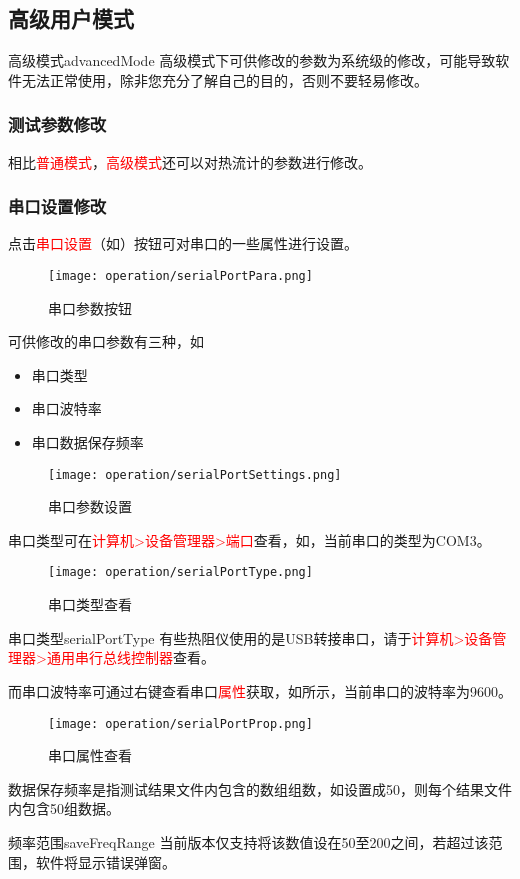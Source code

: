 \subsection{高级用户模式\label{subsec:advancedUser}}
\begin{tips}{高级模式}{advancedMode}
    高级模式下可供修改的参数为系统级的修改，可能导致软件无法正常使用，除非您充分了解自己的目的，否则不要轻易修改。
\end{tips}
\subsubsection*{测试参数修改}
相比\textcolor{red}{普通模式}，\textcolor{red}{高级模式}还可以对热流计的参数进行修改。
\subsubsection*{串口设置修改}
点击\textcolor{red}{串口设置}（如）按钮可对串口的一些属性进行设置。
\begin{figure}[H]
    \centering
    \texttt{[image: operation/serialPortPara.png]}
    \caption{  串口参数按钮 \label{fig:btnSerialPortPara}}
\end{figure}
可供修改的串口参数有三种，如
\begin{itemize}
    \item 串口类型
    \item 串口波特率
    \item 串口数据保存频率
\end{itemize}
\begin{figure}[H]
    \centering
    \texttt{[image: operation/serialPortSettings.png]}
    \caption{  串口参数设置 \label{fig:serialPortSetting}}
\end{figure}
串口类型可在\textcolor{red}{计算机>设备管理器>端口}查看，如，当前串口的类型为COM3。
\begin{figure}[H]
    \centering
    \texttt{[image: operation/serialPortType.png]}
    \caption{  串口类型查看 \label{fig:serialPortType}}
\end{figure}
\begin{tips}{串口类型}{serialPortType}
    有些热阻仪使用的是USB转接串口，请于\textcolor{red}{计算机>设备管理器>通用串行总线控制器}查看。
\end{tips}
而串口波特率可通过右键查看串口\textcolor{red}{属性}获取，如所示，当前串口的波特率为9600。
\begin{figure}[H]
    \centering
    \texttt{[image: operation/serialPortProp.png]}
    \caption{  串口属性查看 \label{fig:serialPortProp}}
\end{figure}
数据保存频率是指测试结果文件内包含的数组组数，如设置成50，则每个结果文件内包含50组数据。
\begin{tips}{频率范围}{saveFreqRange}
    当前版本仅支持将该数值设在50至200之间，若超过该范围，软件将显示错误弹窗。
\end{tips}
